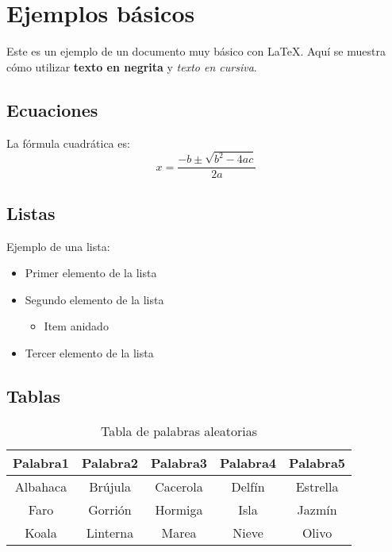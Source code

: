 \documentclass{article}
\begin{document}
\section{Ejemplos básicos}
Este es un ejemplo de un documento muy básico con \LaTeX. Aquí se muestra cómo utilizar \textbf{texto en negrita} y \textit{texto en cursiva}.

\subsection{Ecuaciones}
La fórmula cuadrática es: 
\begin{equation}
x = \frac{-b \pm \sqrt{b^2-4ac}}{2a}
\end{equation}

\subsection{Listas}
Ejemplo de una lista:
\begin{itemize}
    \item Primer elemento de la lista
    \item Segundo elemento de la lista
    \begin{itemize}
        \item Item anidado
    \end{itemize}
    \item Tercer elemento de la lista
\end{itemize}

\subsection{Tablas}
\begin{table}[h]
    \centering
    \begin{tabular}{|c|c|c|c|c|}
        \hline
        Palabra1 & Palabra2 & Palabra3 & Palabra4 & Palabra5 \\ \hline
        Albahaca & Brújula  & Cacerola & Delfín   & Estrella \\ \hline
        Faro     & Gorrión  & Hormiga  & Isla     & Jazmín   \\ \hline
        Koala    & Linterna & Marea    & Nieve    & Olivo    \\ \hline
    \end{tabular}
    \caption{Tabla de palabras aleatorias}
    \label{tab:palabras_aleatorias}
\end{table}
\end{document}

